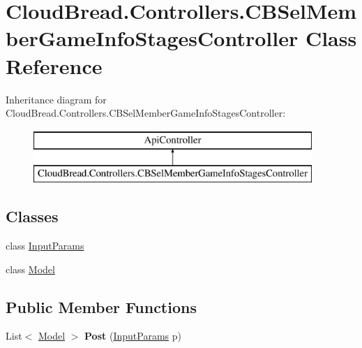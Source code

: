 \hypertarget{class_cloud_bread_1_1_controllers_1_1_c_b_sel_member_game_info_stages_controller}{}\section{Cloud\+Bread.\+Controllers.\+C\+B\+Sel\+Member\+Game\+Info\+Stages\+Controller Class Reference}
\label{class_cloud_bread_1_1_controllers_1_1_c_b_sel_member_game_info_stages_controller}
Inheritance diagram for Cloud\+Bread.\+Controllers.\+C\+B\+Sel\+Member\+Game\+Info\+Stages\+Controller\+:\begin{figure}[H]
\begin{center}
\leavevmode
\includegraphics[height=2.000000cm]{class_cloud_bread_1_1_controllers_1_1_c_b_sel_member_game_info_stages_controller}
\end{center}
\end{figure}
\subsection*{Classes}
\begin{DoxyCompactItemize}
\item 
class \hyperlink{class_cloud_bread_1_1_controllers_1_1_c_b_sel_member_game_info_stages_controller_1_1_input_params}{Input\+Params}
\item 
class \hyperlink{class_cloud_bread_1_1_controllers_1_1_c_b_sel_member_game_info_stages_controller_1_1_model}{Model}
\end{DoxyCompactItemize}
\subsection*{Public Member Functions}
\begin{DoxyCompactItemize}
\item 
List$<$ \hyperlink{class_cloud_bread_1_1_controllers_1_1_c_b_sel_member_game_info_stages_controller_1_1_model}{Model} $>$ {\bfseries Post} (\hyperlink{class_cloud_bread_1_1_controllers_1_1_c_b_sel_member_game_info_stages_controller_1_1_input_params}{Input\+Params} p)\hypertarget{class_cloud_bread_1_1_controllers_1_1_c_b_sel_member_game_info_stages_controller_a115131232527678f913beb72c337143e}{}\label{class_cloud_bread_1_1_controllers_1_1_c_b_sel_member_game_info_stages_controller_a115131232527678f913beb72c337143e}

\end{DoxyCompactItemize}


